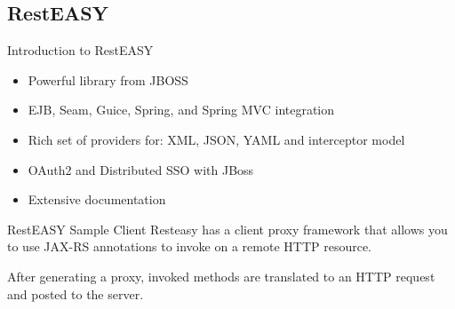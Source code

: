 \subsection{RestEASY}
	\begin{frame}{Introduction to RestEASY}
		\begin{itemize}
		    \item Powerful library from JBOSS
		    \item EJB, Seam, Guice, Spring, and Spring MVC integration 
			\item Rich set of providers for: XML, JSON, YAML and interceptor model
			\item OAuth2 and Distributed SSO with JBoss
			\item Extensive documentation  
		\end{itemize} 
	\end{frame} 

\begin{frame}{RestEASY Sample Client}
	Resteasy has a client proxy framework that allows you to use JAX-RS annotations to invoke on a remote HTTP resource.
	 
	
	After generating a proxy, invoked methods are translated to an HTTP request and posted to the server.
	 
\end{frame}      